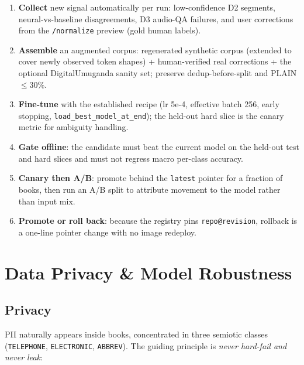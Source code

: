 \documentclass[12pt,a4paper]{article}
\begin{document}
\begin{enumerate}\setlength\itemsep{0.15em}
  \item \textbf{Collect} new signal automatically per run: low-confidence D2 segments, neural-vs-baseline disagreements, D3 audio-QA failures, and user corrections from the \texttt{/normalize} preview (gold human labels).
  \item \textbf{Assemble} an augmented corpus: regenerated synthetic corpus (extended to cover newly observed token shapes) + human-verified real corrections + the optional DigitalUmuganda sanity set; preserve dedup-before-split and PLAIN $\le$30\%.
  \item \textbf{Fine-tune} with the established recipe (lr 5e-4, effective batch 256, early stopping, \texttt{load\_best\_model\_at\_end}); the held-out hard slice is the canary metric for ambiguity handling.
  \item \textbf{Gate offline}: the candidate must beat the current model on the held-out test and hard slices and must not regress macro per-class accuracy.
  \item \textbf{Canary then A/B}: promote behind the \texttt{latest} pointer for a fraction of books, then run an A/B split to attribute movement to the model rather than input mix.
  \item \textbf{Promote or roll back}: because the registry pins \texttt{repo@revision}, rollback is a one-line pointer change with no image redeploy.
\end{enumerate}

\section{Data Privacy \& Model Robustness}

\subsection{Privacy}

PII naturally appears inside books, concentrated in three semiotic classes (\texttt{TELEPHONE}, \texttt{ELECTRONIC}, \texttt{ABBREV}). The guiding principle is \emph{never hard-fail and never leak}:
\end{document}
